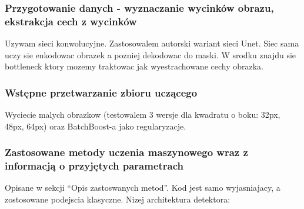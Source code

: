 \documentclass{bmvc2k}
\begin{document}
\subsubsection{Przygotowanie danych - wyznaczanie wycinków obrazu, ekstrakcja cech z wycinków}

Uzywam sieci konwolucyjne. Zastosowalem autorski wariant sieci Unet. Siec sama
uczy sie enkodowac obrazek a pozniej dekodowac do maski. W srodku znajdu sie
bottleneck ktory mozemy traktowac jak wyestrachowane cechy obrazka.

\subsubsection{Wstępne przetwarzanie zbioru uczącego}

Wyciecie malych obrazkow (testowalem 3 wersje dla kwadratu o boku: 32px, 48px,
64px)
oraz BatchBoost-a jako regularyzacje.

\subsubsection{Zastosowane metody uczenia maszynowego wraz z informacją o przyjętych parametrach}

Opisane w sekcji ``Opis zastoswanych metod''. Kod jest samo wyjasniajacy, a
zostosowane podejscia klasyczne. Nizej architektura detektora:
\end{document}
